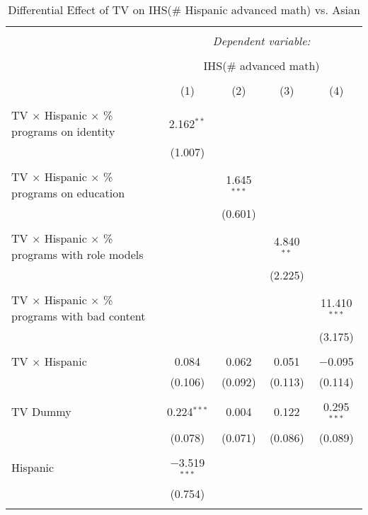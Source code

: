 
\begin{table}[!htbp] \centering 
  \caption{Differential Effect of TV on IHS(\# Hispanic advanced math) vs. Asian} 
  \label{} 
\begin{tabular}{@{\extracolsep{-2pt}}lcccc} 
\\[-1.8ex]\hline 
\hline \\[-1.8ex] 
 & \multicolumn{4}{c}{\textit{Dependent variable:}} \\ 
\cline{2-5} 
\\[-1.8ex] & \multicolumn{4}{c}{IHS(\# advanced math)} \\ 
\\[-1.8ex] & (1) & (2) & (3) & (4)\\ 
\hline \\[-1.8ex] 
 TV $\times$ Hispanic $\times$ \% programs on identity & 2.162$^{**}$ &  &  &  \\ 
  & (1.007) &  &  &  \\ 
  & & & & \\ 
 TV $\times$ Hispanic $\times$ \% programs on education &  & 1.645$^{***}$ &  &  \\ 
  &  & (0.601) &  &  \\ 
  & & & & \\ 
 TV $\times$ Hispanic $\times$ \% programs with role models &  &  & 4.840$^{**}$ &  \\ 
  &  &  & (2.225) &  \\ 
  & & & & \\ 
 TV $\times$ Hispanic $\times$ \% programs with bad content &  &  &  & 11.410$^{***}$ \\ 
  &  &  &  & (3.175) \\ 
  & & & & \\ 
 TV $\times$ Hispanic & 0.084 & 0.062 & 0.051 & $-$0.095 \\ 
  & (0.106) & (0.092) & (0.113) & (0.114) \\ 
  & & & & \\ 
 TV Dummy & 0.224$^{***}$ & 0.004 & 0.122 & 0.295$^{***}$ \\ 
  & (0.078) & (0.071) & (0.086) & (0.089) \\ 
  & & & & \\ 
 Hispanic & $-$3.519$^{***}$ &  &  &  \\ 
  & (0.754) &  &  &  \\ 
  & & & & \\ 

\end{tabular}
\end{table}

